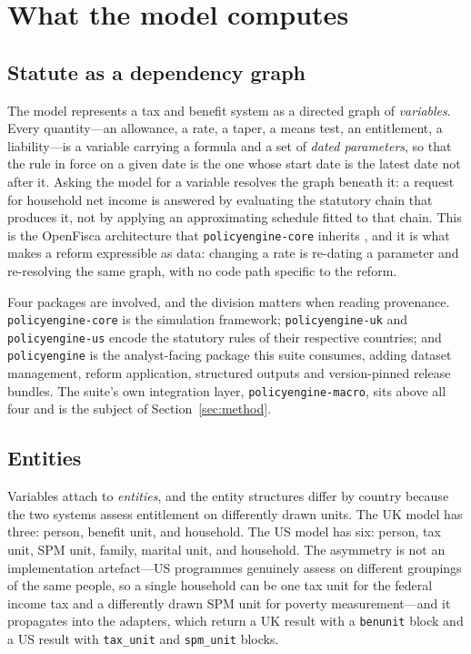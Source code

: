 \section{What the model computes}
\label{sec:model}

\subsection{Statute as a dependency graph}
\label{sec:graph}

The model represents a tax and benefit system as a directed graph of \emph{variables}. Every quantity---an allowance, a rate, a taper, a means test, an entitlement, a liability---is a variable carrying a formula and a set of \emph{dated parameters}, so that the rule in force on a given date is the one whose start date is the latest date not after it. Asking the model for a variable resolves the graph beneath it: a request for household net income is answered by evaluating the statutory chain that produces it, not by applying an approximating schedule fitted to that chain. This is the OpenFisca architecture that \texttt{policyengine-core} inherits \citep{openfisca}, and it is what makes a reform expressible as data: changing a rate is re-dating a parameter and re-resolving the same graph, with no code path specific to the reform.

Four packages are involved, and the division matters when reading provenance. \texttt{policyengine-core} is the simulation framework; \texttt{policyengine-uk} and \texttt{policyengine-us} encode the statutory rules of their respective countries; and \texttt{policyengine} is the analyst-facing package this suite consumes, adding dataset management, reform application, structured outputs and version-pinned release bundles. The suite's own integration layer, \texttt{policyengine-macro}, sits above all four and is the subject of Section~\ref{sec:method}.

\subsection{Entities}

Variables attach to \emph{entities}, and the entity structures differ by country because the two systems assess entitlement on differently drawn units. The UK model has three: person, benefit unit, and household. The US model has six: person, tax unit, SPM unit, family, marital unit, and household. The asymmetry is not an implementation artefact---US programmes genuinely assess on different groupings of the same people, so a single household can be one tax unit for the federal income tax and a differently drawn SPM unit for poverty measurement---and it propagates into the adapters, which return a UK result with a \texttt{benunit} block and a US result with \texttt{tax\_unit} and \texttt{spm\_unit} blocks.

